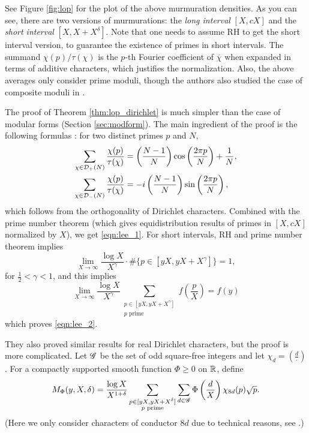 See Figure \ref{fig:lop} for the plot of the above murmuration densities.
As you can see, there are two versions of murmurations: the \emph{long interval} $[X, cX]$ and the \emph{short interval} $[X, X + X^\delta]$.
Note that one needs to assume RH to get the short interval version, to guarantee the existence of primes in short intervals.
The summand $\chi(p) / \tau(\chi)$ is the $p$-th Fourier coefficient of $\overline{\chi}$ when expanded in terms of additive characters, which justifies the normalization.
Also, the above averages only consider prime moduli, though the authors also studied the case of composite moduli in \cite[Section 6.1]{lee2025murmurations}.

The proof of Theorem \ref{thm:lop_dirichlet} is much simpler than the case of modular forms (Section \ref{sec:modform}).
The main ingredient of the proof is the following formulas \cite[Lemma 2.6]{lee2025murmurations}: for two distinct primes $p$ and $N$,
\begin{align}
    \sum_{\chi \in \mathcal{D}_{+}(N)} \frac{\chi(p)}{\tau(\chi)} &= \left(\frac{N-1}{N}\right) \cos \left(\frac{2 \pi p}{N}\right) + \frac{1}{N}, \\
    \sum_{\chi \in \mathcal{D}_{-}(N)} \frac{\chi(p)}{\tau(\chi)} &= -i\left(\frac{N-1}{N}\right) \sin \left(\frac{2 \pi p}{N}\right),
\end{align}
which follows from the orthogonality of Dirichlet characters.
Combined with the prime number theorem (which gives equidistribution results of primes in $[X, cX]$ normalized by $X$), we get \eqref{eqn:lee_1}.
For short intervals, RH and prime number theorem implies
\[
\lim_{X \to \infty} \frac{\log X}{X^\gamma}\cdot \#\{p \in [yX, yX + X^\gamma]\} = 1,
\]
for $\frac{1}{2} < \gamma < 1$, and this implies \cite[Lemma 2.9]{lee2025murmurations} 
\[
\lim_{X \to \infty} \frac{\log X}{X^\gamma} \sum_{\substack{p \in [yX, yX + X^\gamma] \\ p \text{ prime}}} f\left(\frac{p}{X}\right) = f(y)
\]
which proves \eqref{eqn:lee_2}.


They also proved similar results for real Dirichlet characters, but the proof is more complicated.
Let $\mathscr{G}$ be the set of odd square-free integers and let $\chi_{d} = \left(\frac{d}{\cdot}\right)$.
For a compactly supported smooth function $\Phi \ge 0$ on $\mathbb{R}$, define
\begin{equation}
    M_{\Phi}(y, X, \delta) = \frac{\log X}{X^{1 + \delta}} \sum_{\substack{p \in [yX, yX + X^\delta] \\ p \text{ prime}}} \sum_{d \in \mathscr{G}} \Phi\left(\frac{d}{X}\right) \chi_{8d}(p) \sqrt{p}.
\end{equation}
(Here we only consider characters of conductor $8d$ due to technical reasons, see \cite{soundararajan2000nonvanishing}.)

